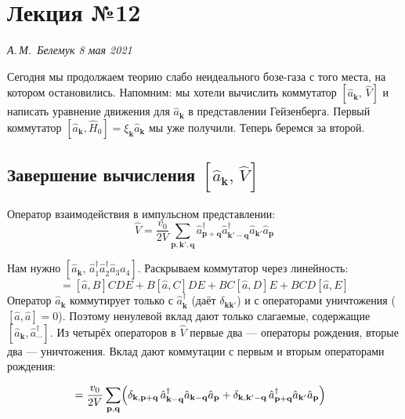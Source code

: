 \documentclass[../general/general]{subfiles}
\begin{document}
\chapter{Лекция №12}
\noindent\textit{А.\,М.~Белемук \hfill 8 мая 2021}
\vspace{1em}
\ifSubfilesClassLoaded{\tableofcontents\newpage}{}

Сегодня мы продолжаем теорию слабо неидеального бозе-газа с того места, на котором остановились. Напомним: мы хотели вычислить коммутатор $[\hat{a}_\mathbf{k},\,\hat{V}]$ и написать уравнение движения для $\hat{a}_\mathbf{k}$ в представлении Гейзенберга. Первый коммутатор $[\hat{a}_\mathbf{k},\hat{H}_0] = \xi_\mathbf{k}\hat{a}_\mathbf{k}$ мы уже получили. Теперь беремся за второй.


\section{Завершение вычисления $[\hat{a}_\mathbf{k},\,\hat{V}]$}

Оператор взаимодействия в импульсном представлении:
\begin{equation}
    \hat{V} = \frac{v_0}{2V}\sum_{\mathbf{p},\mathbf{k}',\mathbf{q}}
    \hat{a}^\dagger_{\mathbf{p}+\mathbf{q}}\hat{a}^\dagger_{\mathbf{k}'-\mathbf{q}}\hat{a}_{\mathbf{k}'}\hat{a}_\mathbf{p}
    \label{eq:V}
\end{equation}

Нам нужно $[\hat{a}_\mathbf{k},\,\hat{a}^\dagger_1\hat{a}^\dagger_2\hat{a}_3\hat{a}_4]$. Раскрываем коммутатор через линейность:
\begin{equation}
    [\hat{a},BCDE] = [\hat{a},B]CDE + B[\hat{a},C]DE + BC[\hat{a},D]E + BCD[\hat{a},E]
\end{equation}
Оператор $\hat{a}_\mathbf{k}$ коммутирует только с $\hat{a}^\dagger_\mathbf{k}$ (даёт $\delta_{\mathbf{k}\mathbf{k}'}$) и с операторами уничтожения ($[\hat{a},\hat{a}]=0$). Поэтому ненулевой вклад дают только слагаемые, содержащие $[\hat{a}_\mathbf{k},\hat{a}^\dagger_{\cdots}]$. Из четырёх операторов в $\hat{V}$ первые два — операторы рождения, вторые два — уничтожения. Вклад дают коммутации с первым и вторым операторами рождения:

\begin{align}
    [\hat{a}_\mathbf{k},\,\hat{V}] &= \frac{v_0}{2V}\sum_{\mathbf{p},\mathbf{q}}
    \Bigl(\delta_{\mathbf{k},\mathbf{p}+\mathbf{q}}\,\hat{a}^\dagger_{\mathbf{k}-\mathbf{q}}\hat{a}_{\mathbf{k}-\mathbf{q}}\hat{a}_\mathbf{p}
    + \delta_{\mathbf{k},\mathbf{k}'-\mathbf{q}}\,\hat{a}^\dagger_{\mathbf{p}+\mathbf{q}}\hat{a}_{\mathbf{k}'}\hat{a}_\mathbf{p}\Bigr)
\end{align}
\end{document}
